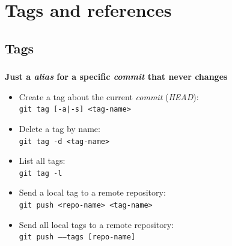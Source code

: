
\section{Tags and references}

\subsection{Tags}
\begin{frame}[fragile]
  \frametitle{\insertsubsection}

  \textbf{Just a \textit{alias} for a specific \textit{commit} that
    never changes}\\ \vspacing
  \begin{itemize}
  \item Create a tag about the current \textit{commit} (\textit{HEAD}):\\
    \texttt{git tag [-a|-s] <tag-name>}
    \vspacing
  \item Delete a tag by name:\\
    \texttt{git tag -d <tag-name>}
    \vspacing
  \item List all tags:\\
    \texttt{git tag -l}
    \vspacing
  \item Send a local tag to a remote repository:\\
    \texttt{git push <repo-name> <tag-name>}
    \vspacing
  \item Send all local tags to a remote repository:\\
    \texttt{git push \---\---tags [repo-name]}
    \vspacing
  \end{itemize}
\end{frame}

